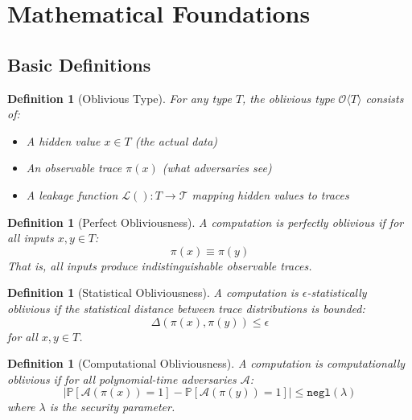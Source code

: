 \documentclass[11pt,final,hidelinks]{article}
\newtheorem{definition}[theorem]{Definition}
\newcommand{\Oblivious}[1]{\mathcal{O}\langle #1 \rangle}
\newcommand{\Pattern}[1]{\pi(#1)}
\newcommand{\Leakage}[1]{\mathcal{L}(#1)}
\newcommand{\Prob}[1]{\mathbb{P}\left[#1\right]}
\newcommand{\negl}[1]{\mathtt{negl}(#1)}
\newcommand{\Adversary}{\mathcal{A}}
\begin{document}
\section{Mathematical Foundations}

\subsection{Basic Definitions}

\begin{definition}[Oblivious Type]
For any type $T$, the oblivious type $\Oblivious{T}$ consists of:
\begin{itemize}
    \item A hidden value $x \in T$ (the actual data)
    \item An observable trace $\Pattern{x}$ (what adversaries see)
    \item A leakage function $\Leakage{}: T \to \mathcal{T}$ mapping hidden values to traces
\end{itemize}
\end{definition}

\begin{definition}[Perfect Obliviousness]
A computation is \emph{perfectly oblivious} if for all inputs $x, y \in T$:
\begin{equation}
\Pattern{x} \equiv \Pattern{y}
\end{equation}
That is, all inputs produce indistinguishable observable traces.
\end{definition}

\begin{definition}[Statistical Obliviousness]
A computation is $\epsilon$-statistically oblivious if the statistical distance between trace distributions is bounded:
\begin{equation}
\Delta(\Pattern{x}, \Pattern{y}) \leq \epsilon
\end{equation}
for all $x, y \in T$.
\end{definition}

\begin{definition}[Computational Obliviousness]
A computation is computationally oblivious if for all polynomial-time adversaries $\Adversary$:
\begin{equation}
\left|\Prob{\Adversary(\Pattern{x}) = 1} - \Prob{\Adversary(\Pattern{y}) = 1}\right| \leq \negl{\lambda}
\end{equation}
where $\lambda$ is the security parameter.
\end{definition}
\end{document}
